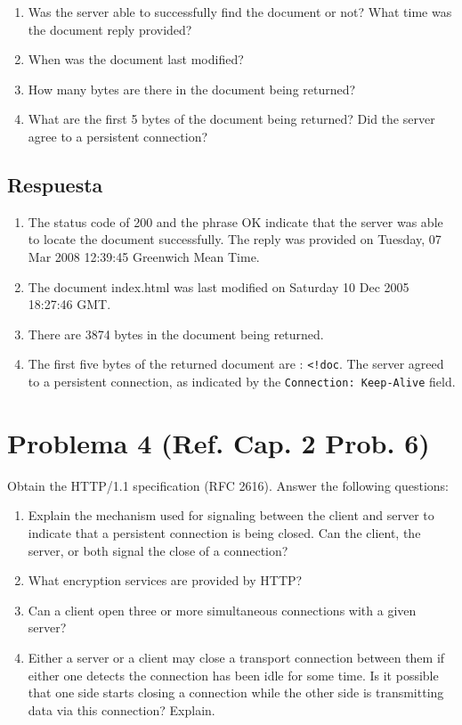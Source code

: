 \documentclass[10pt,spanish]{article}
\numberwithin{figure}{section} %
\begin{document}
\begin{enumerate}
\item Was the server able to successfully find the document or not? What time was the document reply provided?
\item When was the document last modified?
\item How many bytes are there in the document being returned?
\item What are the first 5 bytes of the document being returned? Did the server agree to a persistent connection?
\end{enumerate}

\subsection*{Respuesta}

\begin{enumerate}
\item The status code of 200 and the phrase OK indicate that the server was able to locate the document successfully. The reply was provided on Tuesday, 07 Mar 2008 12:39:45 Greenwich Mean Time.
\item The document index.html was last modified on Saturday 10 Dec 2005 18:27:46 GMT.
\item There are 3874 bytes in the document being returned.
\item The first five bytes of the returned document are : \verb|<!doc|. The server agreed to a persistent connection, as indicated by the \verb|Connection: Keep-Alive| field.
\end{enumerate}

\newpage

\section[Problema 4]{Problema 4 \textnormal{\Large{(Ref. Cap. 2 Prob. 6)}}}
Obtain the HTTP/1.1 specification (RFC 2616). Answer the following questions:

\begin{enumerate}
\item Explain the mechanism used for signaling between the client and server to indicate that a persistent connection is being closed. Can the client, the server, or both signal the close of a connection?
\item What encryption services are provided by HTTP?
\item Can a client open three or more simultaneous connections with a given server?
\item Either a server or a client may close a transport connection between them if either one detects the connection has been idle for some time. Is it possible that one side starts closing a connection while the other side is transmitting data via this connection? Explain.
\end{enumerate}
\end{document}
